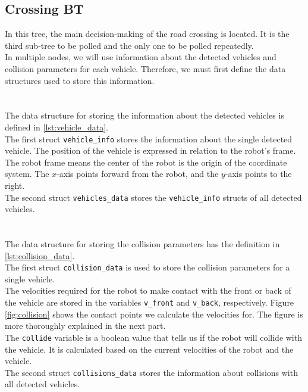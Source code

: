 \subsection{Crossing BT}
\label{sec:Crossing-BT-impl}
    In this tree, the main decision-making of the road crossing is located. It is the third sub-tree to be polled and the only one to be polled repeatedly.\\
    In multiple nodes, we will use information about the detected vehicles and collision parameters for each vehicle. Therefore, we must first define the data structures used to store this information.\\\\
    \\
        The data structure for storing the information about the detected vehicles is defined in \ref{lst:vehicle_data}.\\
        The first struct \texttt{vehicle\_info} stores the information about the single detected vehicle. The position of the vehicle is expressed in relation to the robot's frame. The robot frame means the center of the robot is the origin of the coordinate system. The $x$-axis points forward from the robot, and the $y$-axis points to the right.\\
        The second struct \texttt{vehicles\_data} stores the \texttt{vehicle\_info} structs of all detected vehicles.\\\\
    \\
        The data structure for storing the collision parameters has the definition in \ref{lst:collision_data}.\\
        The first struct \texttt{collision\_data} is used to store the collision parameters for a single vehicle.\\
        The velocities required for the robot to make contact with the front or back of the vehicle are stored in the variables \texttt{v\_front} and \texttt{v\_back}, respectively. Figure \ref{fig:collision} shows the contact points we calculate the velocities for. The figure is more thoroughly explained in the next part.\\
        The \texttt{collide} variable is a boolean value that tells us if the robot will collide with the vehicle. It is calculated based on the current velocities of the robot and the vehicle.\\
        The second struct \texttt{collisions\_data} stores the information about collisions with all detected vehicles.\\\\
